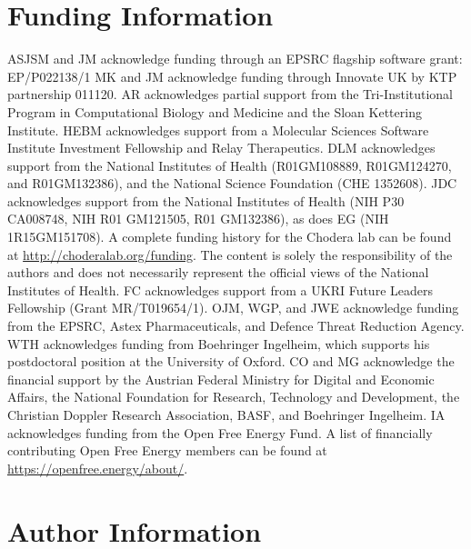 \documentclass[9pt,bestpractices]{livecoms}
\begin{document}
\section*{Funding Information}
ASJSM and JM acknowledge funding through an EPSRC flagship software grant: EP/P022138/1
MK and JM acknowledge funding through Innovate UK by KTP partnership 011120.
AR acknowledges partial support from the Tri-Institutional Program in Computational Biology and Medicine and the Sloan Kettering Institute.
HEBM acknowledges support from a Molecular Sciences Software Institute Investment Fellowship and Relay Therapeutics.
DLM acknowledges support from the National Institutes of Health (R01GM108889, R01GM124270, and R01GM132386), and the National Science Foundation (CHE 1352608).
JDC acknowledges support from the National Institutes of Health (NIH P30 CA008748, NIH R01 GM121505, R01 GM132386), as does EG (NIH 1R15GM151708).
A complete funding history for the Chodera lab can be found at \url{http://choderalab.org/funding}.
The content is solely the responsibility of the authors and does not necessarily represent the official views of the National Institutes of Health.
FC acknowledges support from a UKRI Future Leaders Fellowship (Grant MR/T019654/1).
OJM, WGP, and JWE acknowledge funding from the EPSRC, Astex Pharmaceuticals, and Defence Threat Reduction Agency.
WTH acknowledges funding from Boehringer Ingelheim, which supports his postdoctoral position at the University of Oxford.
CO and MG acknowledge the financial support by the Austrian Federal Ministry for Digital and Economic Affairs, the National Foundation for Research, Technology and Development, the Christian Doppler Research Association, BASF, and Boehringer Ingelheim.
IA acknowledges funding from the Open Free Energy Fund. A list of financially contributing Open Free Energy members can be found at \url{https://openfree.energy/about/}.


\section*{Author Information}
\makeorcid



\end{document}
